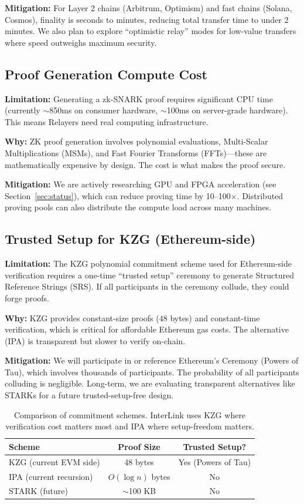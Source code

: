 \documentclass[11pt,a4paper]{article}
\begin{document}
\textbf{Mitigation:} For Layer 2 chains (Arbitrum, Optimism) and fast chains (Solana, Cosmos), finality is seconds to minutes, reducing total transfer time to under 2 minutes. We also plan to explore ``optimistic relay'' modes for low-value transfers where speed outweighs maximum security.

\subsection{Proof Generation Compute Cost}

\textbf{Limitation:} Generating a zk-SNARK proof requires significant CPU time (currently $\sim$850ms on consumer hardware, $\sim$100ms on server-grade hardware). This means Relayers need real computing infrastructure.

\textbf{Why:} ZK proof generation involves polynomial evaluations, Multi-Scalar Multiplications (MSMs), and Fast Fourier Transforms (FFTs)---these are mathematically expensive by design. The cost is what makes the proof secure.

\textbf{Mitigation:} We are actively researching GPU and FPGA acceleration (see Section~\ref{sec:status}), which can reduce proving time by 10--100$\times$. Distributed proving pools can also distribute the compute load across many machines.

\subsection{Trusted Setup for KZG (Ethereum-side)}

\textbf{Limitation:} The KZG polynomial commitment scheme used for Ethereum-side verification requires a one-time ``trusted setup'' ceremony to generate Structured Reference Strings (SRS). If all participants in the ceremony collude, they could forge proofs.

\textbf{Why:} KZG provides constant-size proofs (48 bytes) and constant-time verification, which is critical for affordable Ethereum gas costs. The alternative (IPA) is transparent but slower to verify on-chain.

\textbf{Mitigation:} We will participate in or reference Ethereum's Ceremony (Powers of Tau), which involves thousands of participants. The probability of all participants colluding is negligible. Long-term, we are evaluating transparent alternatives like STARKs for a future trusted-setup-free design.

\begin{table}[H]
\centering
\begin{tabular}{@{}lcc@{}}
\toprule
\textbf{Scheme} & \textbf{Proof Size} & \textbf{Trusted Setup?} \\
\midrule
KZG (current EVM side) & 48 bytes & Yes (Powers of Tau) \\
IPA (current recursion) & $O(\log n)$ bytes & No \\
STARK (future) & $\sim$100 KB & No \\
\bottomrule
\end{tabular}
\caption{Comparison of commitment schemes. InterLink uses KZG where verification cost matters most and IPA where setup-freedom matters.}
\end{table}
\end{document}
